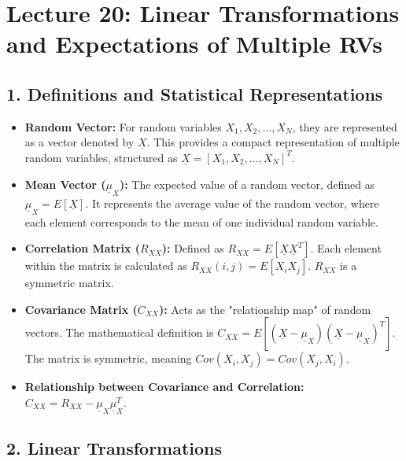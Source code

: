 \documentclass[12pt]{article}
\begin{document}
\section*{Lecture 20: Linear Transformations and Expectations of Multiple RVs}

\subsection*{1. Definitions and Statistical Representations}

\begin{itemize}
    \item \textbf{Random Vector:} For random variables $X_1, X_2, \dots, X_N$, they are represented as a vector denoted by $\underline{X}$. This provides a compact representation of multiple random variables, structured as $\underline{X} = [X_1, X_2, \dots, X_N]^T$.
    \item \textbf{Mean Vector ($\underline{\mu}_X$):} The expected value of a random vector, defined as $\underline{\mu}_X = E[\underline{X}]$. It represents the average value of the random vector, where each element corresponds to the mean of one individual random variable.
    \item \textbf{Correlation Matrix ($R_{XX}$):} Defined as $R_{XX} = E[\underline{X}\underline{X}^T]$. Each element within the matrix is calculated as $R_{XX}(i, j) = E[X_iX_j]$. $R_{XX}$ is a symmetric matrix.
    \item \textbf{Covariance Matrix ($C_{XX}$):} Acts as the "relationship map" of random vectors. The mathematical definition is $C_{XX} = E[(\underline{X} - \underline{\mu}_X)(\underline{X} - \underline{\mu}_X)^T]$. The matrix is symmetric, meaning $Cov(X_i, X_j) = Cov(X_j, X_i)$.
    \item \textbf{Relationship between Covariance and Correlation:} $C_{XX} = R_{XX} - \underline{\mu}_X\underline{\mu}_X^T$.
\end{itemize}

\subsection*{2. Linear Transformations}
\end{document}
